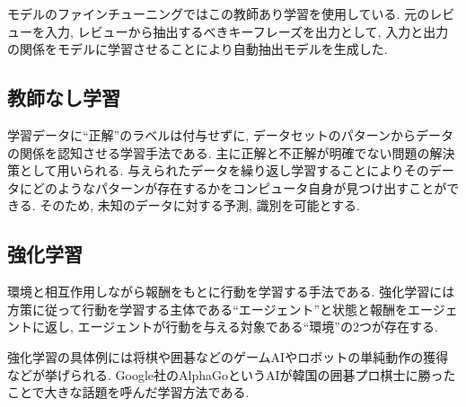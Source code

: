 モデルのファインチューニングではこの教師あり学習を使用している. 元のレビューを入力, レビューから抽出するべきキーフレーズを出力として, 入力と出力の関係をモデルに学習させることにより自動抽出モデルを生成した.

\subsection{教師なし学習}
学習データに``正解''のラベルは付与せずに, データセットのパターンからデータの関係を認知させる学習手法である. 主に正解と不正解が明確でない問題の解決策として用いられる. 
与えられたデータを繰り返し学習することによりそのデータにどのようなパターンが存在するかをコンピュータ自身が見つけ出すことができる. 
そのため, 未知のデータに対する予測, 識別を可能とする. 


\subsection{強化学習}
環境と相互作用しながら報酬をもとに行動を学習する手法である. 強化学習には方策に従って行動を学習する主体である``エージェント''と状態と報酬をエージェントに返し, エージェントが行動を与える対象である``環境''の2つが存在する. 

強化学習の具体例には将棋や囲碁などのゲームAIやロボットの単純動作の獲得などが挙げられる. Google社のAlphaGoというAIが韓国の囲碁プロ棋士に勝ったことで大きな話題を呼んだ学習方法である. 





